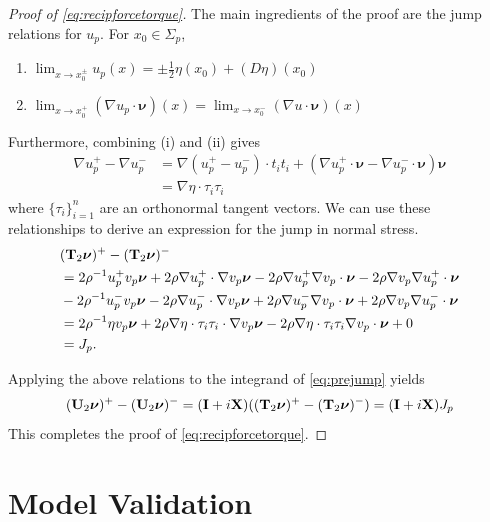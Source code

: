 \documentclass[lineno]{jfm}
\newcommand{\nnu}{\boldsymbol{\nu}}
\begin{document}
\begin{proof}[Proof of \eqref{eq:recipforcetorque}]
  The main ingredients of the proof are the jump relations
  for $u_p$. For $x_0 \in \Sigma_p$,
  \begin{enumerate}
  \item $ \lim_{x \to x_0^\pm } u_p(x) = \pm\frac{1}{2}\eta(x_0) + (D\eta)(x_0)$
  \item $ \lim_{x \to x_0^+ } (\nabla u_p \cdot \nnu) (x) = \lim_{x \to
    x_0^-} (\nabla u \cdot \nnu)(x)$
  \end{enumerate}
  Furthermore,
  combining (i) and (ii) gives
  \begin{align*}
    \nabla u_p^+ - \nabla u_p^-
    &= \nabla (u_p^+ - u_p^-) \cdot t_i t_i +  (\nabla  u_p^+\cdot
    \nnu  - \nabla u_p^- \cdot \nnu) \nnu\\
    &= \nabla \eta \cdot \tau_i \tau_i
  \end{align*}
  where $\{\tau_i\}_{i=1}^n$ are an orthonormal tangent vectors.
  We can use these relationships to derive an expression for the jump in
  normal stress.
  \begin{align*}
    &({\bf T}_2\nnu)^+ - ({\bf T}_2\nnu)^-
    \\
    &= 2\rho^{-1} u_p^+v_p \nnu + 2\rho \nabla u_p^+ \cdot \nabla v_p
    \nnu
    - 2 \rho \nabla u_p^+  \nabla v_p \cdot \nnu
    - 2 \rho \nabla v_p  \nabla u_p^+ \cdot \nnu\\
    &-2\rho^{-1} u_p^-v_p \nnu - 2\rho \nabla u_p^- \cdot \nabla v_p \nnu
    + 2 \rho \nabla u_p^-  \nabla v_p \cdot \nnu
    + 2 \rho \nabla v_p  \nabla u_p^- \cdot \nnu\\
    &= 2\rho^{-1} \eta v_p \nnu + 2\rho \nabla \eta \cdot \tau_i \tau_i
    \cdot \nabla v_p \nnu
    - 2\rho \nabla \eta \cdot \tau_i \tau_i \nabla v_p \cdot \nnu + 0\\
    &= J_p.
  \end{align*}

  Applying the above relations to the integrand of \eqref{eq:prejump} yields
  \[
  ({\bf U}_2\nnu)^+ - ({\bf U}_2\nnu)^-
  =
  ({\bf I} + i {\bf X})(({\bf T}_2\nnu)^+ - ({\bf T}_2\nnu)^-)
  = ({\bf I} + i {\bf X})J_p
  \]
  This completes the proof of \eqref{eq:recipforcetorque}.
\end{proof}





\section{\label{validation}Model Validation}
\end{document}

